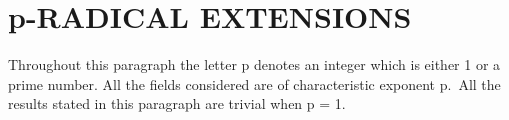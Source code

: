 \section{p-RADICAL EXTENSIONS}

Throughout this paragraph the letter p denotes an integer which is either 1 or a prime number. All the fields considered are of characteristic exponent p.~All the results stated in this paragraph are trivial when p = 1.

